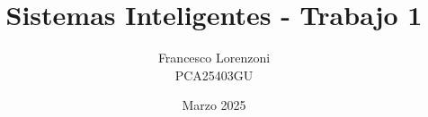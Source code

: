 


\title{Sistemas Inteligentes - Trabajo 1}
\author{Francesco Lorenzoni\\\textsc{PCA25403GU}}
\date{Marzo 2025}


\makeatletter
\renewcommand{\l@section}{\@dottedtocline{1}{1.5em}{2.6em}}
\renewcommand{\l@subsection}{\@dottedtocline{2}{2.5em}{3.6em}}
\renewcommand{\l@subsubsection}{\@dottedtocline{3}{3.5em}{4.5em}}
\makeatother
{} %



\doparttoc[n]



\tableofcontents



